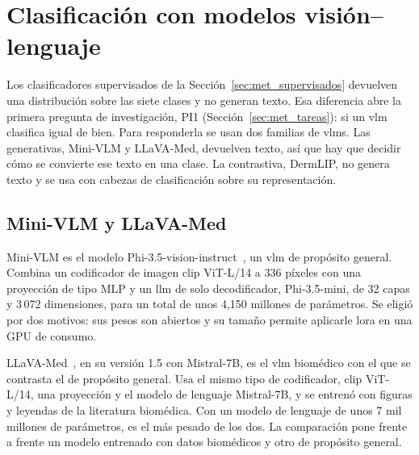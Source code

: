 \section{Clasificación con modelos visión--lenguaje}
\label{sec:met_clasif_vlm}

Los clasificadores supervisados de la Sección~\ref{sec:met_supervisados} devuelven una distribución sobre las siete
clases y no generan texto. Esa diferencia abre la primera pregunta de investigación, PI1 (Sección~\ref{sec:met_tareas}):
si un \gls{vlm} clasifica igual de bien. Para responderla se usan dos familias de \glspl{vlm}. Las generativas, Mini-VLM
y LLaVA-Med, devuelven texto, así que hay que decidir cómo se convierte ese texto en una clase. La contrastiva, DermLIP,
no genera texto y se usa con cabezas de clasificación sobre su representación.

\subsection{Mini-VLM y LLaVA-Med}
\label{sec:met_vlm_generativos}

Mini-VLM es el modelo Phi-3.5-vision-instruct~\cite{abdin2024phi3}, un \gls{vlm} de propósito general. Combina un
codificador de imagen \gls{clip} ViT-L/14 a 336 píxeles con una proyección de tipo MLP y un \gls{llm} de solo
decodificador, Phi-3.5-mini, de 32 capas y 3\,072 dimensiones, para un total de unos 4,150 millones de parámetros.
Se eligió por dos motivos: sus pesos son abiertos y su tamaño permite aplicarle \gls{lora} en una GPU de consumo.

LLaVA-Med~\cite{li2023llavamed}, en su versión 1.5 con Mistral-7B, es el \gls{vlm} biomédico con el que se contrasta
el de propósito general. Usa el mismo tipo de codificador, \gls{clip} ViT-L/14, una proyección y el modelo de lenguaje
Mistral-7B, y se entrenó con figuras y leyendas de la literatura biomédica. Con un modelo de lenguaje de unos 7 mil
millones de parámetros, es el más pesado de los dos. La comparación pone frente a frente un modelo entrenado con datos biomédicos y otro de propósito general.


